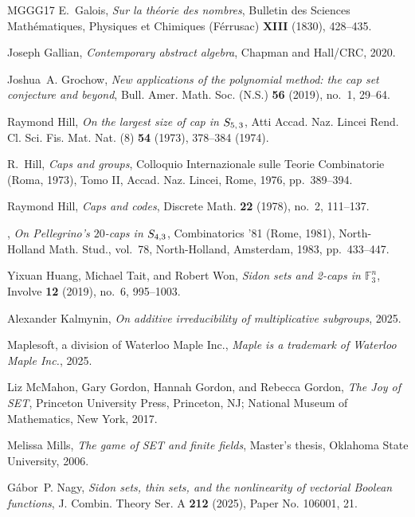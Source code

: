 \documentclass[12pt]{amsart}
\theoremstyle{definition}
\begin{document}
\begin{thebibliography}{MGGG17}
E.~Galois, \emph{Sur la th\'eorie des nombres}, Bulletin des Sciences
  Math\'ematiques, Physiques et Chimiques \textrm{(F\'errusac)} \textbf{XIII}
  (1830), 428--435.

Joseph Gallian, \emph{Contemporary abstract algebra}, Chapman and Hall/CRC,
  2020.

Joshua~A. Grochow, \emph{New applications of the polynomial method: the cap set
  conjecture and beyond}, Bull. Amer. Math. Soc. (N.S.) \textbf{56} (2019),
  no.~1, 29--64.

Raymond Hill, \emph{On the largest size of cap in {$S\sb{5,\,3}$}}, Atti Accad.
  Naz. Lincei Rend. Cl. Sci. Fis. Mat. Nat. (8) \textbf{54} (1973), 378--384
  (1974).

R.~Hill, \emph{Caps and groups}, Colloquio {I}nternazionale sulle {T}eorie
  {C}ombinatorie ({R}oma, 1973), {T}omo {II}, Accad. Naz. Lincei, Rome, 1976,
  pp.~389--394.

Raymond Hill, \emph{Caps and codes}, Discrete Math. \textbf{22} (1978), no.~2,
  111--137.

\bysame, \emph{On {P}ellegrino's {$20$}-caps in {$S\sb{4,3}$}}, Combinatorics
  '81 ({R}ome, 1981), North-Holland Math. Stud., vol.~78, North-Holland,
  Amsterdam, 1983, pp.~433--447.

Yixuan Huang, Michael Tait, and Robert Won, \emph{Sidon sets and 2-caps in
  {$\mathbb F^n_3$}}, Involve \textbf{12} (2019), no.~6, 995--1003.

Alexander Kalmynin, \emph{On additive irreducibility of multiplicative
  subgroups}, 2025.

{Maplesoft, a division of Waterloo Maple Inc.}, \emph{{Maple is a trademark of
  Waterloo Maple Inc.}}, 2025.

Liz McMahon, Gary Gordon, Hannah Gordon, and Rebecca Gordon, \emph{The {J}oy of
  {SET}}, Princeton University Press, Princeton, NJ; National Museum of
  Mathematics, New York, 2017.

Melissa Mills, \emph{The game of {SET} and finite fields}, Master's thesis,
  Oklahoma State University, 2006.

G\'abor~P. Nagy, \emph{Sidon sets, thin sets, and the nonlinearity of vectorial
  {B}oolean functions}, J. Combin. Theory Ser. A \textbf{212} (2025), Paper No.
  106001, 21.


\end{thebibliography}
\end{document}
